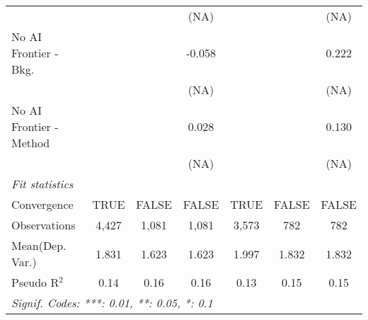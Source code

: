 \begin{tabular}{lcccccc}
                           &              &       & (NA)   &               &       & (NA)\\   
   No AI Frontier - Bkg.   &              &       & -0.058 &               &       & 0.222\\   
                           &              &       & (NA)   &               &       & (NA)\\   
   No AI Frontier - Method &              &       & 0.028  &               &       & 0.130\\   
                           &              &       & (NA)   &               &       & (NA)\\   
   \midrule
   \emph{Fit statistics}\\
   Convergence             &TRUE          & FALSE & FALSE  & TRUE          & FALSE & FALSE\\  
   Observations            & 4,427        & 1,081 & 1,081  & 3,573         & 782   & 782\\  
Mean(Dep. Var.) & 1.831 & 1.623 & 1.623 & 1.997 & 1.832 & 1.832 \\
   Pseudo R$^2$            & 0.14         & 0.16  & 0.16   & 0.13          & 0.15  & 0.15\\  
   \midrule \midrule
   \multicolumn{7}{l}{\emph{Signif. Codes: ***: 0.01, **: 0.05, *: 0.1}}\\
\end{tabular}
\par\endgroup
